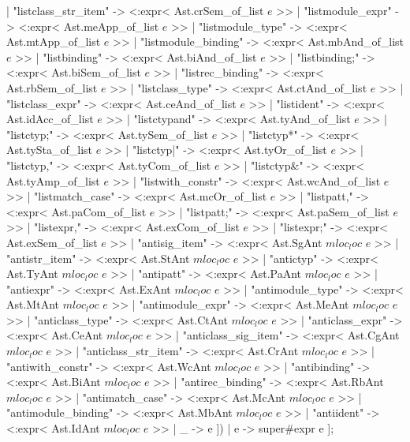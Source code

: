 \begin{enumerate}
\begin{bluetext}
            | "listclass_str_item" -> <:expr< Ast.crSem_of_list $e$ >>
            | "listmodule_expr" -> <:expr< Ast.meApp_of_list $e$ >>
            | "listmodule_type" -> <:expr< Ast.mtApp_of_list $e$ >>
            | "listmodule_binding" -> <:expr< Ast.mbAnd_of_list $e$ >>
            | "listbinding" -> <:expr< Ast.biAnd_of_list $e$ >>
            | "listbinding;" -> <:expr< Ast.biSem_of_list $e$ >>
            | "listrec_binding" -> <:expr< Ast.rbSem_of_list $e$ >>
            | "listclass_type" -> <:expr< Ast.ctAnd_of_list $e$ >>
            | "listclass_expr" -> <:expr< Ast.ceAnd_of_list $e$ >>
            | "listident" -> <:expr< Ast.idAcc_of_list $e$ >>
            | "listctypand" -> <:expr< Ast.tyAnd_of_list $e$ >>
            | "listctyp;" -> <:expr< Ast.tySem_of_list $e$ >>
            | "listctyp*" -> <:expr< Ast.tySta_of_list $e$ >>
            | "listctyp|" -> <:expr< Ast.tyOr_of_list $e$ >>
            | "listctyp," -> <:expr< Ast.tyCom_of_list $e$ >>
            | "listctyp&" -> <:expr< Ast.tyAmp_of_list $e$ >>
            | "listwith_constr" -> <:expr< Ast.wcAnd_of_list $e$ >>
            | "listmatch_case" -> <:expr< Ast.mcOr_of_list $e$ >>
            | "listpatt," -> <:expr< Ast.paCom_of_list $e$ >>
            | "listpatt;" -> <:expr< Ast.paSem_of_list $e$ >>
            | "listexpr," -> <:expr< Ast.exCom_of_list $e$ >>
            | "listexpr;" -> <:expr< Ast.exSem_of_list $e$ >>
            | "antisig_item" -> <:expr< Ast.SgAnt $mloc _loc$ $e$ >>
            | "antistr_item" -> <:expr< Ast.StAnt $mloc _loc$ $e$ >>
            | "antictyp" -> <:expr< Ast.TyAnt $mloc _loc$ $e$ >>
            | "antipatt" -> <:expr< Ast.PaAnt $mloc _loc$ $e$ >>
            | "antiexpr" -> <:expr< Ast.ExAnt $mloc _loc$ $e$ >>
            | "antimodule_type" -> <:expr< Ast.MtAnt $mloc _loc$ $e$ >>
            | "antimodule_expr" -> <:expr< Ast.MeAnt $mloc _loc$ $e$ >>
            | "anticlass_type" -> <:expr< Ast.CtAnt $mloc _loc$ $e$ >>
            | "anticlass_expr" -> <:expr< Ast.CeAnt $mloc _loc$ $e$ >>
            | "anticlass_sig_item" -> <:expr< Ast.CgAnt $mloc _loc$ $e$ >>
            | "anticlass_str_item" -> <:expr< Ast.CrAnt $mloc _loc$ $e$ >>
            | "antiwith_constr" -> <:expr< Ast.WcAnt $mloc _loc$ $e$ >>
            | "antibinding" -> <:expr< Ast.BiAnt $mloc _loc$ $e$ >>
            | "antirec_binding" -> <:expr< Ast.RbAnt $mloc _loc$ $e$ >>
            | "antimatch_case" -> <:expr< Ast.McAnt $mloc _loc$ $e$ >>
            | "antimodule_binding" -> <:expr< Ast.MbAnt $mloc _loc$ $e$ >>
            | "antiident" -> <:expr< Ast.IdAnt $mloc _loc$ $e$ >>
            | _ -> e ])
      | e -> super#expr e ];
\end{bluetext}


\end{enumerate}
